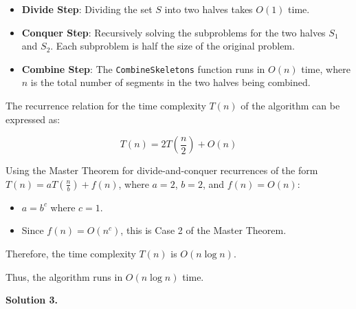 \documentclass[12pt]{article}
\newcommand{\solution}[1]{\noindent \textbf{Solution #1.}}
\begin{document}
        \begin{itemize}
            \item \textbf{Divide Step}:
            Dividing the set \( S \) into two halves takes \( O(1) \) time.

            \item \textbf{Conquer Step}:
            Recursively solving the subproblems for the two halves \( S_1 \) and \( S_2 \). Each subproblem is half the size of the original problem.

            \item \textbf{Combine Step}:
            The \texttt{CombineSkeletons} function runs in \( O(n) \) time, where \( n \) is the total number of segments in the two halves being combined.
        \end{itemize}

        The recurrence relation for the time complexity \( T(n) \) of the algorithm can be expressed as:

        \[
        T(n) = 2T\left(\frac{n}{2}\right) + O(n)
        \]

        Using the Master Theorem for divide-and-conquer recurrences of the form \( T(n) = aT\left(\frac{n}{b}\right) + f(n) \), where \( a = 2 \), \( b = 2 \), and \( f(n) = O(n) \):
        \begin{itemize}

        \item \( a = b^c \) where \( c = 1 \).
        \item Since \( f(n) = O(n^c) \), this is Case 2 of the Master Theorem.

        \end{itemize}

        Therefore, the time complexity \( T(n) \) is \( O(n \log n) \).

        Thus, the algorithm runs in \( O(n \log n) \) time.

\newpage

\solution{3}
\end{document}
